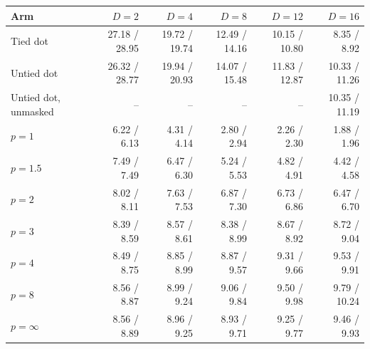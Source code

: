 \begin{tabular}{lrrrrr}
\toprule
Arm & $D=2$ & $D=4$ & $D=8$ & $D=12$ & $D=16$ \\
\midrule
Tied dot & 27.18 / 28.95 & 19.72 / 19.74 & 12.49 / 14.16 & 10.15 / 10.80 & 8.35 / 8.92 \\
Untied dot & 26.32 / 28.77 & 19.94 / 20.93 & 14.07 / 15.48 & 11.83 / 12.87 & 10.33 / 11.26 \\
Untied dot, unmasked & -- & -- & -- & -- & 10.35 / 11.19 \\
$p=1$ & 6.22 / 6.13 & 4.31 / 4.14 & 2.80 / 2.94 & 2.26 / 2.30 & 1.88 / 1.96 \\
$p=1.5$ & 7.49 / 7.49 & 6.47 / 6.30 & 5.24 / 5.53 & 4.82 / 4.91 & 4.42 / 4.58 \\
$p=2$ & 8.02 / 8.11 & 7.63 / 7.53 & 6.87 / 7.30 & 6.73 / 6.86 & 6.47 / 6.70 \\
$p=3$ & 8.39 / 8.59 & 8.57 / 8.61 & 8.38 / 8.99 & 8.67 / 8.92 & 8.72 / 9.04 \\
$p=4$ & 8.49 / 8.75 & 8.85 / 8.99 & 8.87 / 9.57 & 9.31 / 9.66 & 9.53 / 9.91 \\
$p=8$ & 8.56 / 8.87 & 8.99 / 9.24 & 9.06 / 9.84 & 9.50 / 9.98 & 9.79 / 10.24 \\
$p=\infty$ & 8.56 / 8.89 & 8.96 / 9.25 & 8.93 / 9.71 & 9.25 / 9.77 & 9.46 / 9.93 \\
\bottomrule
\end{tabular}
